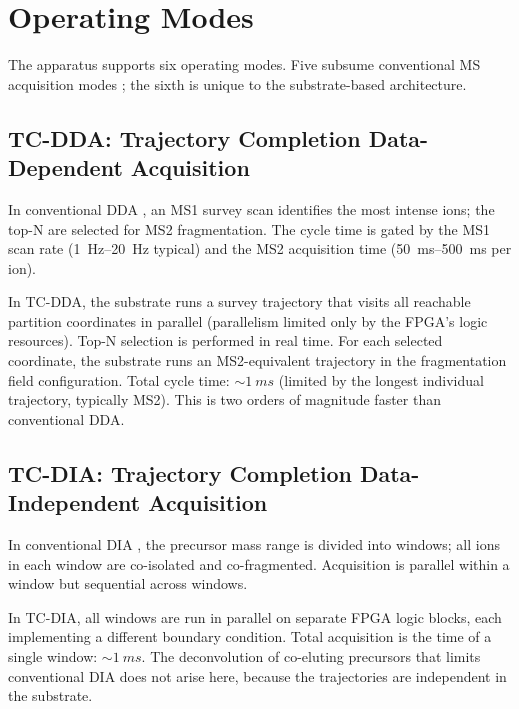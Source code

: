 \documentclass[twocolumn,11pt,a4paper]{article}
\theoremstyle{definition}
\theoremstyle{remark}
\begin{document}
\section{Operating Modes}
\label{sec:modes}

The apparatus supports six operating modes. Five subsume conventional MS acquisition modes \citep{gillet2012,lange2008,peterson2012,stahl1996}; the sixth is unique to the substrate-based architecture.

\subsection{TC-DDA: Trajectory Completion Data-Dependent Acquisition}

In conventional DDA \citep{stahl1996,mann2008}, an MS1 survey scan identifies the most intense ions; the top-N are selected for MS2 fragmentation. The cycle time is gated by the MS1 scan rate (\SIrange{1}{20}{Hz} typical) and the MS2 acquisition time (\SIrange{50}{500}{ms} per ion).

In TC-DDA, the substrate runs a survey trajectory that visits all reachable partition coordinates in parallel (parallelism limited only by the FPGA's logic resources). Top-N selection is performed in real time. For each selected coordinate, the substrate runs an MS2-equivalent trajectory in the fragmentation field configuration. Total cycle time: $\sim\SI{1}{ms}$ (limited by the longest individual trajectory, typically MS2). This is two orders of magnitude faster than conventional DDA.

\subsection{TC-DIA: Trajectory Completion Data-Independent Acquisition}

In conventional DIA \citep{venable2004,gillet2012}, the precursor mass range is divided into windows; all ions in each window are co-isolated and co-fragmented. Acquisition is parallel within a window but sequential across windows.

In TC-DIA, all windows are run in parallel on separate FPGA logic blocks, each implementing a different boundary condition. Total acquisition is the time of a single window: $\sim\SI{1}{ms}$. The deconvolution of co-eluting precursors that limits conventional DIA does not arise here, because the trajectories are independent in the substrate.
\end{document}
